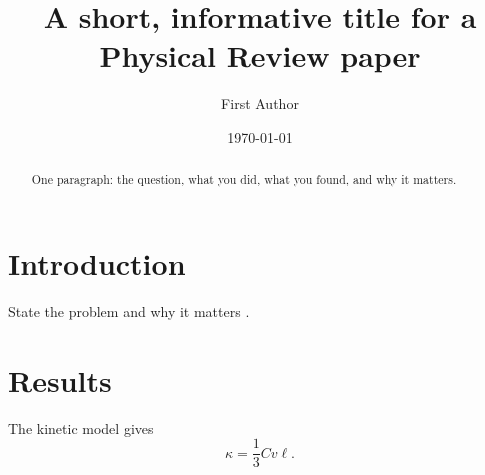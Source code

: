 \documentclass[reprint,aps,prb]{revtex4-2}
\begin{document}
\title{A short, informative title for a Physical Review paper}
\author{First Author}
\date{\today}

\begin{abstract}
One paragraph: the question, what you did, what you found, and why it matters.
\end{abstract}
\maketitle

\section{Introduction}
State the problem and why it matters \cite{callaway1959}.

\section{Results}
The kinetic model gives
\begin{equation}
  \kappa = \frac{1}{3} C v \ell .
\end{equation}


\end{document}
